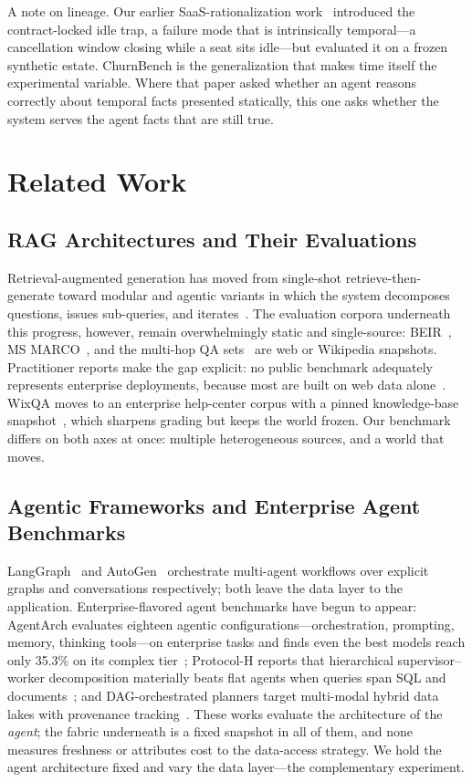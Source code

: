 \documentclass{ieeeaccess}
\begin{document}
A note on lineage. Our earlier SaaS-rationalization work~\cite{saasrat} introduced
the contract-locked idle trap, a failure mode that is intrinsically temporal---a
cancellation window closing while a seat sits idle---but evaluated it on a frozen
synthetic estate. ChurnBench is the generalization that makes time itself the
experimental variable. Where that paper asked whether an agent reasons correctly
about temporal facts presented statically, this one asks whether the system serves
the agent facts that are still true.

\section{Related Work}
\label{sec:related}

\subsection{RAG Architectures and Their Evaluations}
Retrieval-augmented generation has moved from single-shot retrieve-then-generate
toward modular and agentic variants in which the system decomposes questions,
issues sub-queries, and iterates~\cite{ragsurvey}. The evaluation corpora
underneath this progress, however, remain overwhelmingly static and single-source:
BEIR~\cite{beir}, MS MARCO~\cite{msmarco}, and the multi-hop QA
sets~\cite{musique, twowiki} are web or Wikipedia snapshots. Practitioner reports
make the gap explicit: no public benchmark adequately represents enterprise
deployments, because most are built on web data alone~\cite{onyx}. WixQA moves to
an enterprise help-center corpus with a pinned knowledge-base snapshot~\cite{wixqa},
which sharpens grading but keeps the world frozen. Our benchmark differs on both
axes at once: multiple heterogeneous sources, and a world that moves.

\subsection{Agentic Frameworks and Enterprise Agent Benchmarks}
LangGraph~\cite{langgraph} and AutoGen~\cite{autogen} orchestrate multi-agent
workflows over explicit graphs and conversations respectively; both leave the data
layer to the application. Enterprise-flavored agent benchmarks have begun to
appear: AgentArch evaluates eighteen agentic configurations---orchestration,
prompting, memory, thinking tools---on enterprise tasks and finds even the best
models reach only 35.3\% on its complex tier~\cite{agentarch}; Protocol-H reports
that hierarchical supervisor--worker decomposition materially beats flat agents
when queries span SQL and documents~\cite{protocolh}; and DAG-orchestrated planners
target multi-modal hybrid data lakes with provenance tracking~\cite{daglakes}.
These works evaluate the architecture of the \emph{agent}; the fabric underneath
is a fixed snapshot in all of them, and none measures freshness or attributes cost
to the data-access strategy. We hold the agent architecture fixed and vary the
data layer---the complementary experiment.
\end{document}
